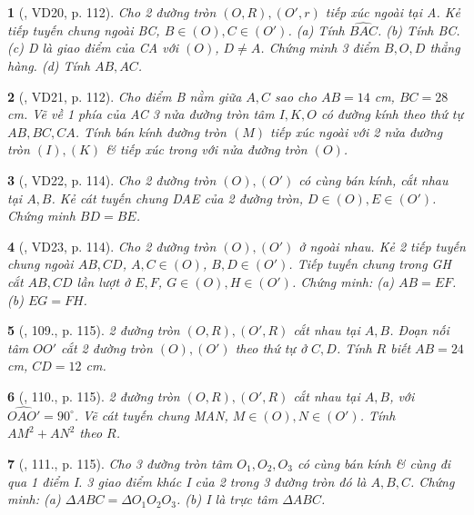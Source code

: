 \documentclass{article}
\newtheorem{baitoan}{}
\begin{document}
\begin{baitoan}[\cite{Binh_Toan_9_tap_1}, VD20, p. 112]
	Cho 2 đường tròn $(O,R),(O',r)$ tiếp xúc ngoài tại A. Kẻ tiếp tuyến chung ngoài BC, $B\in(O),C\in(O')$. (a) Tính $\widehat{BAC}$. (b) Tính BC. (c) D là giao điểm của CA với $(O)$, $D\ne A$. Chứng minh 3 điểm $B,O,D$ thẳng hàng. (d) Tính $AB,AC$.
\end{baitoan}

\begin{baitoan}[\cite{Binh_Toan_9_tap_1}, VD21, p. 112]
	Cho điểm B nằm giữa $A,C$ sao cho $AB = 14$ {\rm cm}, $BC = 28$ {\rm cm}. Vẽ về 1 phía của AC 3 nửa đường tròn tâm $I,K,O$ có đường kính theo thứ tự $AB,BC,CA$. Tính bán kính đường tròn $(M)$ tiếp xúc ngoài với 2 nửa đường tròn $(I),(K)$ \& tiếp xúc trong với nửa đường tròn $(O)$.
\end{baitoan}

\begin{baitoan}[\cite{Binh_Toan_9_tap_1}, VD22, p. 114]
	Cho 2 đường tròn $(O),(O')$ có cùng bán kính, cắt nhau tại $A,B$. Kẻ cát tuyến chung DAE của 2 đường tròn, $D\in(O),E\in(O')$. Chứng minh $BD = BE$.
\end{baitoan}

\begin{baitoan}[\cite{Binh_Toan_9_tap_1}, VD23, p. 114]
	Cho 2 đường tròn $(O),(O')$ ở ngoài nhau. Kẻ 2 tiếp tuyến chung ngoài $AB,CD$, $A,C\in(O)$, $B,D\in(O')$. Tiếp tuyến chung trong GH cắt $AB,CD$ lần lượt ở $E,F$, $G\in(O),H\in(O')$. Chứng minh: (a) $AB = EF$. (b) $EG = FH$.
\end{baitoan}

\begin{baitoan}[\cite{Binh_Toan_9_tap_1}, 109., p. 115]
	2 đường tròn $(O,R),(O',R)$ cắt nhau tại $A,B$. Đoạn nối tâm $OO'$ cắt 2 đường tròn $(O),(O')$ theo thứ tự ở $C,D$. Tính $R$ biết $AB = 24$ {\rm cm}, $CD = 12$ {\rm cm}.
\end{baitoan}

\begin{baitoan}[\cite{Binh_Toan_9_tap_1}, 110., p. 115]
	2 đường tròn $(O,R),(O',R)$ cắt nhau tại $A,B$, với $\widehat{OAO'} = 90^\circ$. Vẽ cát tuyến chung MAN, $M\in(O),N\in(O')$. Tính $AM^2 + AN^2$ theo $R$.
\end{baitoan}

\begin{baitoan}[\cite{Binh_Toan_9_tap_1}, 111., p. 115]
	Cho 3 đường tròn tâm $O_1,O_2,O_3$ có cùng bán kính \& cùng đi qua 1 điểm I. 3 giao điểm khác I của 2 trong 3 đường tròn đó là $A,B,C$. Chứng minh: (a) $\Delta ABC = \Delta O_1O_2O_3$. (b) I là trực tâm $\Delta ABC$.
\end{baitoan}
\end{document}
